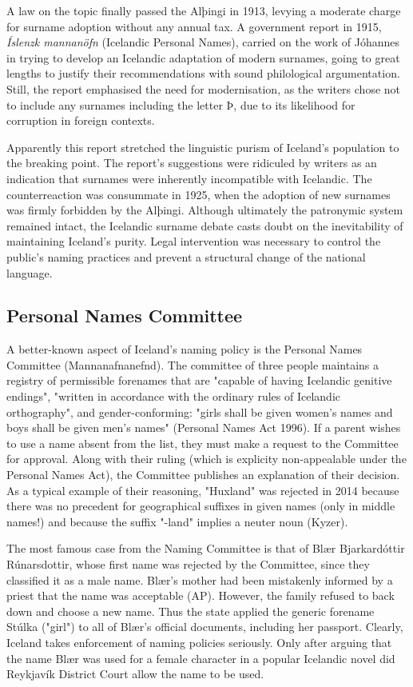 A law on the topic finally passed the Alþingi in 1913, levying a moderate charge for surname adoption without any annual tax. A government report in 1915, \textit{Íslenzk mannanöfn} (Icelandic Personal Names), carried on the work of Jóhannes in trying to develop an Icelandic adaptation of modern surnames, going to great lengths to justify their recommendations with sound philological argumentation. Still, the report emphasised the need for modernisation, as the writers chose not to include any surnames including the letter Þ, due to its likelihood for corruption in foreign contexts.

Apparently this report stretched the linguistic purism of Iceland's population to the breaking point. The report's suggestions were ridiculed by writers as an indication that surnames were inherently incompatible with Icelandic. The counterreaction was consummate in 1925, when the adoption of new surnames was firmly forbidden by the Alþingi. Although ultimately the patronymic system remained intact, the Icelandic surname debate casts doubt on the inevitability of maintaining Iceland's purity. Legal intervention was necessary to control the public's naming practices and prevent a structural change of the national language.

\subsection{Personal Names Committee}

A better-known aspect of Iceland's naming policy is the Personal Names Committee (Mannanafnanefnd). The committee of three people maintains a registry of permissible forenames that are "capable of having Icelandic genitive endings", "written in accordance with the ordinary rules of Icelandic orthography", and gender-conforming: "girls shall be given women's names and boys shall be given men's names" (Personal Names Act 1996). If a parent wishes to use a name absent from the list, they must make a request to the Committee for approval. Along with their ruling (which is explicity non-appealable under the Personal Names Act), the Committee publishes an explanation of their decision. As a typical example of their reasoning, "Huxland" was rejected in 2014 because there was no precedent for geographical suffixes in given names (only in middle names!) and because the suffix "-land" implies a neuter noun (Kyzer).

The most famous case from the Naming Committee is that of Blær Bjarkardóttir Rúnarsdottir, whose first name was rejected by the Committee, since they classified it as a male name. Blær's mother had been mistakenly informed by a priest that the name was acceptable (AP). However, the family refused to back down and choose a new name. Thus the state applied the generic forename Stúlka ("girl") to all of Blær's official documents, including her passport. Clearly, Iceland takes enforcement of naming policies seriously. Only after arguing that the name Blær was used for a female character in a popular Icelandic novel did Reykjavík District Court allow the name to be used.

